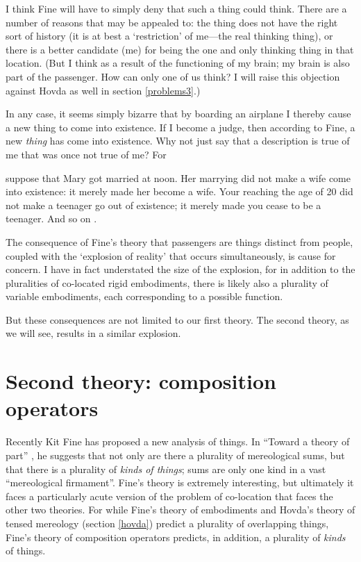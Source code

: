 \documentclass[11pt]{article}
\newenvironment{squote}{%
\begin{spacing}{1}
\begin{list}{}{%
\setlength{\labelwidth}{0pt}%
\rightmargin\leftmargin%
}
\item\relax
}{%
\end{list}%
\end{spacing}
}
\begin{document}
\begin{spacing}{1.5}
I think Fine will have to simply deny that such a thing could think.
There are a number of reasons that may be appealed to: the thing does
not have the right sort of history (it is at best a `restriction' of
me---the real thinking thing), or there is a better candidate (me) for
being the one and only thinking thing in that location.  (But I think
as a result of the functioning of my brain; my brain is also part of
the passenger.  How can only one of us think?  I will raise this
objection against Hovda as well in section \ref{problems3}.)

In any case, it seems simply bizarre that by boarding an airplane I
thereby cause a new thing to come into existence.  If I become a
judge, then according to Fine, a new {\em thing} has come into
existence.  Why not just say that a description is true of me that was
once not true of me?  For

\begin{squote}
suppose that Mary got married at noon.  Her marrying did not make a
wife come into existence: it merely made her become a wife.  Your
reaching the age of 20 did not make a teenager go out of existence; it
merely made you cease to be a teenager.  And so on
\citep[151]{thomson1998a}.
\end{squote}

The consequence of Fine's theory that passengers are things distinct
from people, coupled with the `explosion of reality' that occurs
simultaneously, is cause for concern.  I have in fact understated the
size of the explosion, for in addition to the pluralities of
co-located rigid embodiments, there is likely also a plurality of
variable embodiments, each corresponding to a possible function.

But these consequences are not limited to our first theory.  The
second theory, as we will see, results in a similar explosion.

\section{Second theory: composition operators}
\label{fine-c}
Recently Kit Fine has proposed a new analysis of things.  In ``Toward
a theory of part'' \citeyearpar{fine2010}, he suggests that not only
are there a plurality of mereological sums, but that there is a
plurality of {\em kinds of things}; sums are only one kind in a vast
``mereological firmament''.  Fine's theory is extremely interesting,
but ultimately it faces a particularly acute version of the problem of
co-location that faces the other two theories.  For while Fine's
theory of embodiments and Hovda's theory of tensed mereology (section
\ref{hovda}) predict a plurality of overlapping things, Fine's theory
of composition operators predicts, in addition, a plurality of {\em
  kinds} of things.


\end{spacing}
\end{document}
